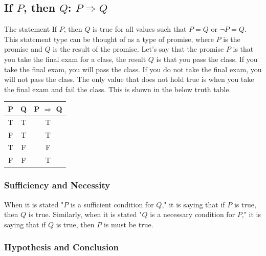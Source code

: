 \documentclass{article}
\begin{document}
\newpage
\subsection{If $P$, then $Q$: $P \Rightarrow Q$}

The statement If $P$, then $Q$ is true for all values such that $P = Q$ or $\lnot P = Q$. This statement type can be thought of as a type of promise, where $P$ is the promise and $Q$ is the result of the promise. Let's say that the promise $P$ is that you take the final exam for a class, the result $Q$ is that you pass the class. If you take the final exam, you will pass the class. If you do not take the final exam, you will not pass the class. The only value that does not hold true is when you take the final exam and fail the class. This is shown in the below truth table.

\begin{table}[!htb]
    \centering
    \begin{tabular}{|c|c|c|}
        \hline
        \textbf{P} & \textbf{Q} & \textbf{P $\Rightarrow$ Q} \\ \hline
        \rowcolor[HTML]{67FD9A} 
        T          & T          & T                             \\ \hline
        \rowcolor[HTML]{67FD9A} 
        F          & T          & T                             \\ \hline
        T          & F          & F                             \\ \hline
        \rowcolor[HTML]{67FD9A} 
        F          & F          & T                             \\ \hline
    \end{tabular}
\end{table}

\subsubsection{Sufficiency and Necessity}

When it is stated "$P$ is a sufficient condition for $Q$," it is saying that if $P$ is true, then $Q$ is true. Similarly, when it is stated "$Q$ is a necessary condition for $P$," it is saying that if $Q$ is true, then $P$ is must be true.

\subsubsection{Hypothesis and Conclusion}
\end{document}
